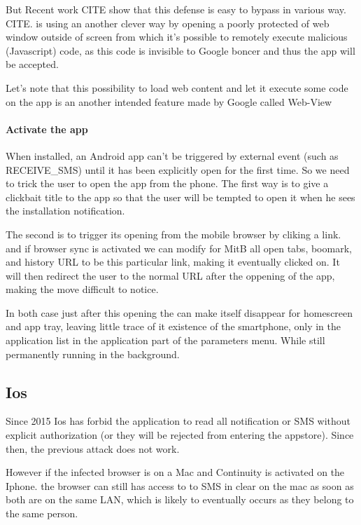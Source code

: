 \documentclass[11pt, a4paper,twocolumn]{article}
\begin{document}
But Recent work CITE show that this defense is easy to bypass in various way. CITE. \cite{Base} is using an another clever way by opening a poorly protected of web window outside of screen from which it's possible to remotely execute malicious (Javascript) code, as this code is invisible to Google boncer and thus the app will be accepted.

Let's note that this possibility to load web content and let it execute some code on the app is an another intended feature made by Google called Web-View

\paragraph{Activate the app} When installed, an Android app can't be triggered by external event (such as RECEIVE\_SMS) until it has been explicitly open for the first time. So we need to trick the user to open the app from the phone. The 
first way is to give a clickbait title to the app so that the user will be tempted to open it when he sees the installation notification.

The second is to trigger its opening from the mobile browser by cliking a link. and if browser sync is activated we can modify for MitB all open tabs, boomark, and history URL to be this particular link, making it eventually clicked on. It will then redirect the user to the normal URL after the oppening of the app, making the move difficult to notice.

In both case just after this opening the can make itself disappear for homescreen and app tray, leaving little trace of it existence of the smartphone, only in the application list in the application part of the parameters menu. While still permanently running in the background.

\subsection{Ios}
Since 2015 Ios has forbid the application to read all notification or SMS without explicit authorization (or they will be rejected from entering the appstore). 
Since then, the previous attack does not work. 

However if the infected browser is on a Mac and Continuity is activated on the Iphone. the browser can still has access to to SMS in clear on the mac as soon as both are on the same LAN, which is likely to eventually occurs as they belong to the same person. 
\end{document}
